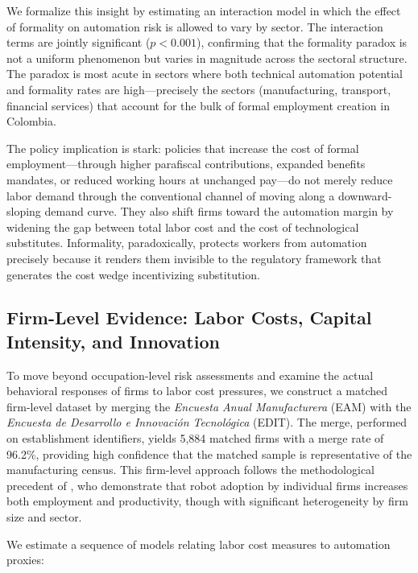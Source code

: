\documentclass{article}
\begin{document}
We formalize this insight by estimating an interaction model in which the effect of formality on automation risk is allowed to vary by sector. The interaction terms are jointly significant ($p < 0.001$), confirming that the formality paradox is not a uniform phenomenon but varies in magnitude across the sectoral structure. The paradox is most acute in sectors where both technical automation potential and formality rates are high---precisely the sectors (manufacturing, transport, financial services) that account for the bulk of formal employment creation in Colombia.

The policy implication is stark: policies that increase the cost of formal employment---through higher parafiscal contributions, expanded benefits mandates, or reduced working hours at unchanged pay---do not merely reduce labor demand through the conventional channel of moving along a downward-sloping demand curve. They also shift firms toward the automation margin by widening the gap between total labor cost and the cost of technological substitutes. Informality, paradoxically, protects workers from automation precisely because it renders them invisible to the regulatory framework that generates the cost wedge incentivizing substitution.


\subsection{Firm-Level Evidence: Labor Costs, Capital Intensity, and Innovation}
\label{subsec:firm_results}

To move beyond occupation-level risk assessments and examine the actual behavioral responses of firms to labor cost pressures, we construct a matched firm-level dataset by merging the \textit{Encuesta Anual Manufacturera} (EAM) with the \textit{Encuesta de Desarrollo e Innovaci\'on Tecnol\'ogica} (EDIT). The merge, performed on establishment identifiers, yields 5,884 matched firms with a merge rate of 96.2\%, providing high confidence that the matched sample is representative of the manufacturing census. This firm-level approach follows the methodological precedent of \cite{koch2021}, who demonstrate that robot adoption by individual firms increases both employment and productivity, though with significant heterogeneity by firm size and sector.

We estimate a sequence of models relating labor cost measures to automation proxies:
\end{document}
